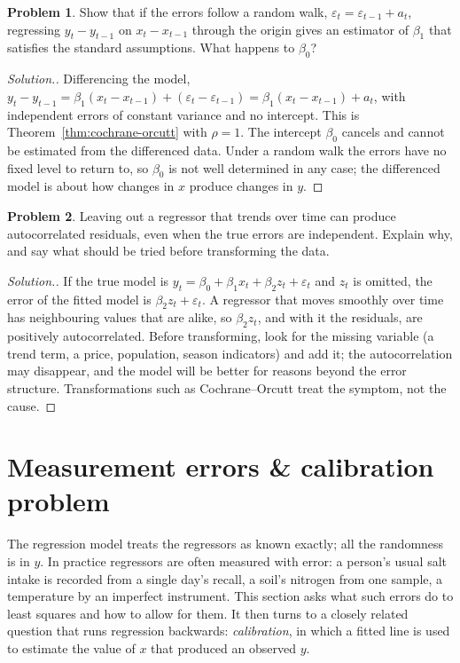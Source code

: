 \documentclass[11pt,a4paper]{article}
\numberwithin{equation}{section}
\theoremstyle{definition}
\newtheorem{problemx}{Problem}[subsection]
\newenvironment{problem}{\begin{problemx}}{\end{problemx}}
\newenvironment{solution}
  {\renewcommand{\qedsymbol}{}\begin{proof}[\textit{Solution}.]}
  {\end{proof}}
\begin{document}
\begin{problem}\label{prob:first-diff}
Show that if the errors follow a random walk, $\varepsilon_t = \varepsilon_{t-1} + a_t$, regressing $y_t - y_{t-1}$ on $x_t - x_{t-1}$ through the origin
gives an estimator of $\beta_1$ that satisfies the standard assumptions. What happens to $\beta_0$?
\end{problem}

\begin{solution}
Differencing the model, $y_t - y_{t-1} = \beta_1(x_t - x_{t-1}) + (\varepsilon_t - \varepsilon_{t-1}) = \beta_1(x_t - x_{t-1}) + a_t$, with independent errors of constant
variance and no intercept. This is Theorem~\ref{thm:cochrane-orcutt} with $\rho = 1$. The intercept $\beta_0$ cancels and cannot be
estimated from the differenced data. Under a random walk the errors have no fixed level to return to, so
$\beta_0$ is not well determined in any case; the differenced model is about how changes in $x$ produce changes in $y$.
\end{solution}

\begin{problem}\label{prob:omitted}
Leaving out a regressor that trends over time can produce autocorrelated residuals, even when the
true errors are independent. Explain why, and say what should be tried before transforming the data.
\end{problem}

\begin{solution}
If the true model is $y_t = \beta_0 + \beta_1x_t + \beta_2z_t + \varepsilon_t$ and $z_t$ is omitted, the error of the fitted model is $\beta_2z_t + \varepsilon_t$. A
regressor that moves smoothly over time has neighbouring values that are alike, so $\beta_2z_t$, and with it the
residuals, are positively autocorrelated. Before transforming, look for the missing variable (a trend term,
a price, population, season indicators) and add it; the autocorrelation may disappear, and the model will be
better for reasons beyond the error structure. Transformations such as Cochrane--Orcutt treat the symptom,
not the cause.
\end{solution}

\section{Measurement errors \& calibration problem}
The regression model treats the regressors as known exactly; all the randomness is in $y$. In practice
regressors are often measured with error: a person's usual salt intake is recorded from a single day's
recall, a soil's nitrogen from one sample, a temperature by an imperfect instrument. This section asks
what such errors do to least squares and how to allow for them. It then turns to a closely related
question that runs regression backwards: \emph{calibration}, in which a fitted line is used to estimate the
value of $x$ that produced an observed $y$.
\end{document}
